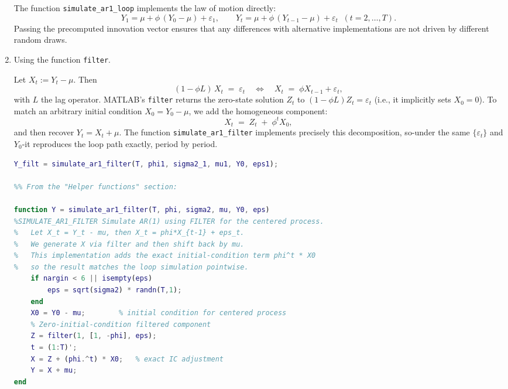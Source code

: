 \documentclass[dvipsnames,11pt]{article}
\begin{document}
\begin{enumerate}[label=\alph*.]
\begin{solution}
                The function \texttt{simulate\_ar1\_loop} implements the law of motion directly:
                \[
                  Y_1 = \mu + \phi\,(Y_0-\mu) + \varepsilon_1,\qquad
                  Y_t = \mu + \phi\,(Y_{t-1}-\mu) + \varepsilon_t \;\; (t=2,\dots,T).
                \]
                Passing the precomputed innovation vector ensures that any differences with alternative implementations are not driven by different random draws.
        
            \end{solution}  

        \item Using the function \texttt{filter}.

            \begin{solution}

                Let $X_t := Y_t-\mu$. Then
                \[
                  (1-\phi L)\,X_t \;=\; \varepsilon_t
                  \quad\Longleftrightarrow\quad
                  X_t \;=\; \phi X_{t-1} + \varepsilon_t,
                \]
                with $L$ the lag operator. MATLAB’s \texttt{filter} returns the zero-state solution $Z_t$ to 
                $ (1-\phi L)Z_t=\varepsilon_t $ (i.e., it implicitly sets $X_0=0$). 
                To match an arbitrary initial condition $X_0=Y_0-\mu$, we add the homogeneous component:
                \[
                  X_t \;=\; Z_t \;+\; \phi^t X_0,
                \]
                and then recover $Y_t=X_t+\mu$. The function \texttt{simulate\_ar1\_filter} implements precisely this decomposition, so-under the same $\{\varepsilon_t\}$ and $Y_0$-it reproduces the loop path exactly, period by period.

\begin{lstlisting}[language=Matlab]
Y_filt = simulate_ar1_filter(T, phi1, sigma2_1, mu1, Y0, eps1);

%% From the "Helper functions" section:

function Y = simulate_ar1_filter(T, phi, sigma2, mu, Y0, eps)
%SIMULATE_AR1_FILTER Simulate AR(1) using FILTER for the centered process.
%   Let X_t = Y_t - mu, then X_t = phi*X_{t-1} + eps_t.
%   We generate X via filter and then shift back by mu.
%   This implementation adds the exact initial-condition term phi^t * X0
%   so the result matches the loop simulation pointwise.
    if nargin < 6 || isempty(eps)
        eps = sqrt(sigma2) * randn(T,1);
    end
    X0 = Y0 - mu;        % initial condition for centered process
    % Zero-initial-condition filtered component
    Z = filter(1, [1, -phi], eps);
    t = (1:T)';
    X = Z + (phi.^t) * X0;   % exact IC adjustment
    Y = X + mu;
end
\end{lstlisting}
                

\end{solution}
\end{enumerate}
\end{document}
